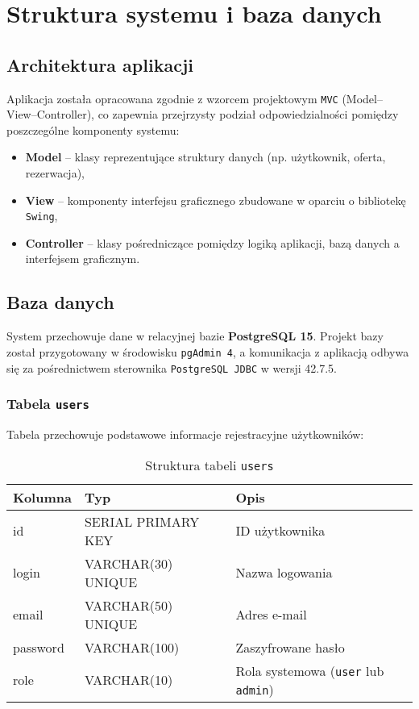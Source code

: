 \chapter{Struktura systemu i baza danych}

\section{Architektura aplikacji}

Aplikacja została opracowana zgodnie z wzorcem projektowym \texttt{MVC} (Model–View–Controller), co zapewnia przejrzysty podział odpowiedzialności pomiędzy poszczególne komponenty systemu:

\begin{itemize}
    \item \textbf{Model} – klasy reprezentujące struktury danych (np. użytkownik, oferta, rezerwacja),
    \item \textbf{View} – komponenty interfejsu graficznego zbudowane w oparciu o bibliotekę \texttt{Swing},
    \item \textbf{Controller} – klasy pośredniczące pomiędzy logiką aplikacji, bazą danych a interfejsem graficznym.
\end{itemize}

\section{Baza danych}

System przechowuje dane w relacyjnej bazie \textbf{PostgreSQL 15}. Projekt bazy został przygotowany w środowisku \texttt{pgAdmin 4}, a komunikacja z aplikacją odbywa się za pośrednictwem sterownika \texttt{PostgreSQL JDBC} w wersji 42.7.5.

\subsection{Tabela \texttt{users}}

Tabela przechowuje podstawowe informacje rejestracyjne użytkowników:

\begin{table}[H]
\centering
\begin{tabular}{|l|l|l|}
\hline
\textbf{Kolumna} & \textbf{Typ} & \textbf{Opis} \\ \hline
id & SERIAL PRIMARY KEY & ID użytkownika \\
login & VARCHAR(30) UNIQUE & Nazwa logowania \\
email & VARCHAR(50) UNIQUE & Adres e-mail \\
password & VARCHAR(100) & Zaszyfrowane hasło \\
role & VARCHAR(10) & Rola systemowa (\texttt{user} lub \texttt{admin}) \\ \hline
\end{tabular}
\caption{Struktura tabeli \texttt{users}}
\end{table}

